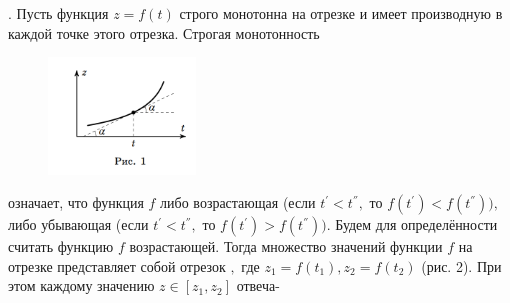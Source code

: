 \documentclass[10pt]{article}
\begin{document}
. Пусть функция \begin{math} z=f(t) \end{math} строго монотонна на отрезке\begin{math}[t_1, t_2] \end{math} и имеет производную в каждой точке этого отрезка. Строгая монотонность\begin{figure}
  \centering
  \includegraphics[width=0.35\textwidth]{Pic1.png}
\end{figure}
 означает, что функция \begin{math} f\end{math} либо возрастающая (если \begin{math} t^{'}<t^{''}, \end{math} то \begin{math} f(t^{'})< f(t^{''})), \end{math} либо убывающая (если \begin{math} t^{'}<t^{''}, \end{math} то \begin{math} f(t^{'})> f(t^{''})). \end{math} Будем для определённости считать функцию \begin{math} f \end{math} возрастающей. Тогда множество значений функции \begin{math} f \end{math} на отрезке\begin{math} [t_1,t_2] \end{math} представляет собой отрезок \begin{math} [z_1,z_2],\end{math} где \begin{math} z_1=f(t_1), z_2=f(t_2) \end{math} (рис. 2). При этом каждому значению \begin{math} z\in[z_1,z_2] \end{math} отвеча- 
\end{document}
